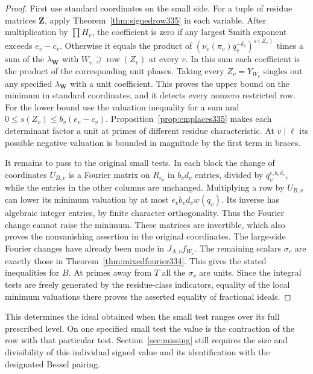 \documentclass[a4paper,11pt]{article}
\theoremstyle{definition}
\theoremstyle{remark}
\numberwithin{equation}{section}
\begin{document}
\begin{proof}
First use standard coordinates on the small side. For a tuple of
residue matrices \(\mathbf Z\), apply Theorem~\ref{thm:signedrow335}
in each variable. After multiplication by \(\prod H_v\), the coefficient
is zero if any largest Smith exponent exceeds \(e_v-c_v\).
Otherwise it equals the product of
\((\nu_v(\pi_v)q_v^{-\delta_v})^{s(Z_v)}\) times a sum of the
\(\lambda_{\mathbf W}\) with
\(W_v\supseteq\operatorname{row}(Z_v)\) at every \(v\). In this sum
each coefficient is the product of the corresponding unit phases.
Taking every \(Z_v=Y_{W_v}\) singles out any specified
\(\lambda_{\mathbf W}\) with a unit coefficient. This proves the
upper bound on the minimum in standard coordinates, and it detects
every nonzero restricted row. For the lower bound use the valuation
inequality for a sum and \(0\le s(Z_v)\le b_v(e_v-c_v)\).
Proposition~\ref{prop:cmplaces335} makes each determinant factor a
unit at primes of different residue characteristic. At \(v\mid\ell\)
its possible negative valuation is bounded in magnitude by the
first term in braces.

It remains to pass to the original small tests. In each block the
change of coordinates \(U_{B,v}\) is a Fourier matrix on \(R_{e_v}\)
in \(b_vd_v\) entries, divided by \(q_v^{e_vb_vd_v}\), while the entries
in the other columns are unchanged. Multiplying a row by \(U_{B,v}\)
can lower its minimum valuation by at most
\(e_vb_vd_v w(q_v)\). Its inverse has algebraic integer
entries, by finite character orthogonality. Thus the Fourier change
cannot raise the minimum. These matrices are invertible, which also
proves the nonvanishing assertion in the original coordinates.
The large-side Fourier changes have already been made in
\(J_{A,v}f_{W_v}\). The remaining scalars \(\sigma_v\) are exactly those
in Theorem~\ref{thm:mixedfourier334}. This gives the stated inequalities
for \(B\). At primes away from \(T\) all the \(\sigma_v\) are units.
Since the integral tests are freely generated by the residue-class
indicators, equality of the local minimum valuations there proves the
asserted equality of fractional ideals.
\end{proof}

This determines the ideal obtained when the small test ranges over
its full prescribed level. On one specified small test the value is
the contraction of the row with that particular test. Section~\ref{sec:missing}
still requires the size and divisibility of this individual signed
value and its identification with the designated Bessel pairing.
\end{document}
